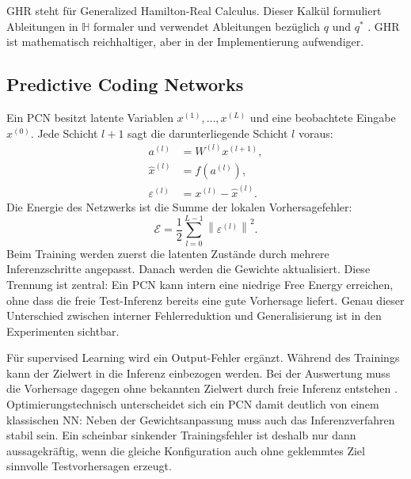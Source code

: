 GHR steht für Generalized Hamilton-Real Calculus. Dieser Kalkül formuliert Ableitungen in $\mathbb{H}$ formaler und verwendet Ableitungen bezüglich $q$ und $q^*$ \cite{xu2015enabling}. GHR ist mathematisch reichhaltiger, aber in der Implementierung aufwendiger.

\subsection{Predictive Coding Networks}

Ein PCN besitzt latente Variablen $x^{(1)},\dots,x^{(L)}$ und eine beobachtete Eingabe $x^{(0)}$. Jede Schicht $l+1$ sagt die darunterliegende Schicht $l$ voraus:
\[
\begin{aligned}
a^{(l)} &= W^{(l)}x^{(l+1)},\\
\hat{x}^{(l)} &= f(a^{(l)}),\\
\varepsilon^{(l)} &= x^{(l)}-\hat{x}^{(l)}.
\end{aligned}
\]
Die Energie des Netzwerks ist die Summe der lokalen Vorhersagefehler:
\[
\mathcal{E}=\frac{1}{2}\sum_{l=0}^{L-1}\left\|\varepsilon^{(l)}\right\|^2.
\]
Beim Training werden zuerst die latenten Zustände durch mehrere Inferenzschritte angepasst. Danach werden die Gewichte aktualisiert. Diese Trennung ist zentral: Ein PCN kann intern eine niedrige Free Energy erreichen, ohne dass die freie Test-Inferenz bereits eine gute Vorhersage liefert. Genau dieser Unterschied zwischen interner Fehlerreduktion und Generalisierung ist in den Experimenten sichtbar.

Für supervised Learning wird ein Output-Fehler ergänzt. Während des Trainings kann der Zielwert in die Inferenz einbezogen werden. Bei der Auswertung muss die Vorhersage dagegen ohne bekannten Zielwert durch freie Inferenz entstehen \cite{stenlund2025pcn,whittington2017approximation,millidge2022predictive}. Optimierungstechnisch unterscheidet sich ein PCN damit deutlich von einem klassischen NN: Neben der Gewichtsanpassung muss auch das Inferenzverfahren stabil sein. Ein scheinbar sinkender Trainingsfehler ist deshalb nur dann aussagekräftig, wenn die gleiche Konfiguration auch ohne geklemmtes Ziel sinnvolle Testvorhersagen erzeugt.
